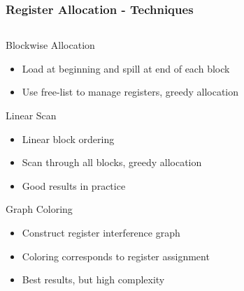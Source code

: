 \documentclass[navbaroff,en]{sdqbeamer}
\begin{document}
\begin{frame}
	\frametitle{Register Allocation - Techniques}

	\begin{columns}
		\begin{column}{0.65\textwidth}
			\begin{contentblock}{Blockwise Allocation}
				\begin{itemize}
					\item Load at beginning and spill at end of each block
					\item Use free-list to manage registers, greedy allocation
				\end{itemize}
			\end{contentblock}
	
			\begin{contentblock}{Linear Scan}
				\begin{itemize}
					\item Linear block ordering
					\item Scan through all blocks, greedy allocation
					\item Good results in practice
				\end{itemize}
			\end{contentblock}
	
			\begin{contentblock}{Graph Coloring}
				\begin{itemize}
					\item Construct register interference graph
					\item Coloring corresponds to register assignment
					\item Best results, but high complexity
				\end{itemize}
			\end{contentblock}
		\end{column}


\end{columns}
\end{frame}
\end{document}
